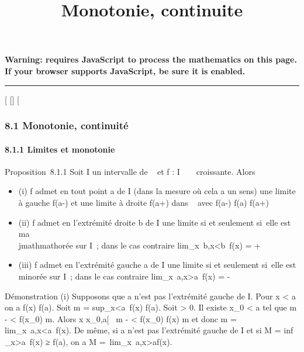 \documentclass[]{article}
\title{Monotonie, continuite}
\author{}
\date{}
\begin{document}
\maketitle

\textbf{Warning: 
requires JavaScript to process the mathematics on this page.\\ If your
browser supports JavaScript, be sure it is enabled.}

\begin{center}\rule{3in}{0.4pt}\end{center}

{[}
{[}{]}
{[}

\subsubsection{8.1 Monotonie, continuité}

\paragraph{8.1.1 Limites et monotonie}

Proposition~8.1.1 Soit I un intervalle de ~ et f : I \rightarrow~ ~ croissante.
Alors

\begin{itemize}
\itemsep1pt\parskip0pt
\item
  (i) f admet en tout point a de I (dans la mesure où cela a un sens)
  une limite à gauche f(a-) et une limite à droite f(a+) dans ~ avec
  f(a-) \leq f(a) \leq f(a+)
\item
  (ii) f admet en l'extrémité droite b de I une limite si et seulement
  si~elle est ma\\jmathmathorée sur I~; dans le cas contraire
  lim_x\rightarrow~b,x\textless{}b~f(x) = +\infty~
\item
  (iii) f admet en l'extrémité gauche a de I une limite si et seulement
  si~elle est minorée sur I~; dans le cas contraire
  lim_x\rightarrow~a,x\textgreater{}a~f(x) = -\infty~
\end{itemize}

Démonstration (i) Supposons que a n'est pas l'extrémité gauche de I.
Pour x \textless{} a on a f(x) \leq f(a). Soit m
= sup_x\textless{}a~f(x) \leq f(a). Soit
\epsilon \textgreater{} 0. Il existe x_0 \textless{} a tel que m - \epsilon
\textless{} f(x_0) \leq m. Alors x \in{]}x_0,a{[}\rigtharrow~ m - \epsilon
\textless{} f(x_0) \leq f(x) \leq m et donc m
= lim_x\rightarrow~a,x\textless{}a~f(x). De même,
si a n'est pas l'extrémité gauche de I et si M
= inf _x\textgreater{}a~f(x) ≥ f(a),
on a M =\
lim_x\rightarrow~a,x\textgreater{}af(x).
\end{document}
